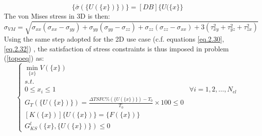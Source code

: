  \begin{equation}
 \label{e.24}
 \lbrace\bar{\sigma}\left(\lbrace U\left(\lbrace x\rbrace\right)\rbrace\right)\rbrace=\left[DB\right]\lbrace U(\lbrace x \rbrace\rbrace
 \end{equation}
  The von Mises stress in 3D is then:
  \begin{equation}
  \label{e.20}
  \sigma_{VM}=\sqrt{\sigma_{xx}(\sigma_{xx}-\sigma_{yy})+\sigma_{yy}(\sigma_{yy}-\sigma_{zz})+\sigma_{zz}(\sigma_{zz}-\sigma_{xx})+3(\tau_{xy}^2+\tau_{yz}^2+\tau_{zx}^2)}
  \end{equation}
Using the same step adopted for the 2D use case (c.f. equations \eqref{eq.2.30}, \eqref{eq.2.32})
, the satisfaction of stress constraints is thus imposed in problem (\ref{topoeq}) as:
\begin{equation}
\label{topoeq2}
\left\lbrace\begin{array}{cc}
\underset{\lbrace x\rbrace}{\min} V\left(\lbrace x\rbrace\right)& \\
s.t. & \\ 0\leq x_i \leq 1  & \forall i=1,2,\dots,N_{el}\\
G_T\left(\lbrace U\left(\lbrace x\rbrace\right)\rbrace\right)=\frac{\Delta TSFC \%\left(\lbrace U\left(\lbrace x\rbrace\right)\rbrace\right)-T_0}{T_0}\times 100 \leq 0 & \\
\left[K\left(\lbrace x\rbrace\right)\right]\lbrace U \left(\lbrace x\rbrace\right) \rbrace = \lbrace F \left(\lbrace x\rbrace\right)\rbrace & \\
G^{l}_{KS}(\lbrace x\rbrace,\lbrace U\left(\lbrace x\rbrace\right)\rbrace)\leq 0
\end{array}\right.
\end{equation}
